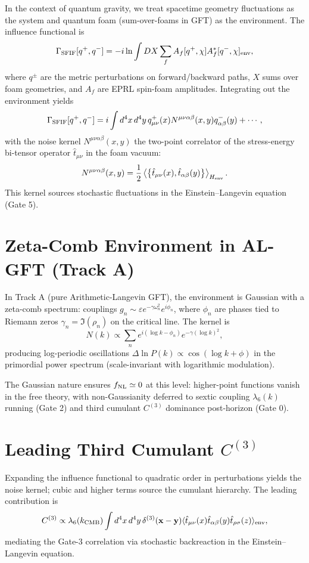 \documentclass[11pt,a4paper,twoside]{article}
\begin{document}
In the context of quantum gravity, we treat spacetime geometry fluctuations as the system and quantum foam (sum-over-foams in GFT) as the environment. The influence functional is
\[
\Gamma_{\rm SFIF}[q^+, q^-] = -i \ln \int DX \sum_{f} A_f[q^+, \chi] A_f^*[q^-, \chi]_{\rm env},
\]
where $q^\pm$ are the metric perturbations on forward/backward paths, $X$ sums over foam geometries, and $A_f$ are EPRL spin-foam amplitudes. Integrating out the environment yields
\[
\Gamma_{\rm SFIF}[q^+, q^-] = i \int d^4x \, d^4y \, q^+_{\mu\nu}(x) N^{\mu\nu\alpha\beta}(x,y) q^-_{\alpha\beta}(y) + \cdots,
\]
with the noise kernel $N^{\mu\nu\alpha\beta}(x,y)$ the two-point correlator of the stress-energy bi-tensor operator $\hat{t}_{\mu\nu}$ in the foam vacuum:
\[
N^{\mu\nu\alpha\beta}(x,y) = \frac{1}{2} \left\langle \left\{ \hat{t}_{\mu\nu}(x), \hat{t}_{\alpha\beta}(y) \right\} \right\rangle_{H_{\rm env}}.
\]
This kernel sources stochastic fluctuations in the Einstein–Langevin equation (Gate 5).

\section{Zeta-Comb Environment in AL-GFT (Track A)}
In Track A (pure Arithmetic-Langevin GFT), the environment is Gaussian with a zeta-comb spectrum: couplings $g_n \sim \varepsilon e^{-\gamma \omega_n^2} e^{i \phi_n}$, where $\phi_n$ are phases tied to Riemann zeros $\gamma_n = \Im(\rho_n)$ on the critical line. The kernel is
\[
N(k) \propto \sum_n e^{i (\log k - \phi_n)} e^{-\gamma (\log k)^2},
\]
producing log-periodic oscillations $\Delta \ln P(k) \propto \cos(\log k + \phi)$ in the primordial power spectrum (scale-invariant with logarithmic modulation).

The Gaussian nature ensures $f_{\rm NL} \simeq 0$ at this level: higher-point functions vanish in the free theory, with non-Gaussianity deferred to sextic coupling $\lambda_6(k)$ running (Gate 2) and third cumulant $C^{(3)}$ dominance post-horizon (Gate 0).

\section{Leading Third Cumulant $C^{(3)}$}
Expanding the influence functional to quadratic order in perturbations yields the noise kernel; cubic and higher terms source the cumulant hierarchy. The leading contribution is
\[
C^{(3)} \propto \lambda_6(k_{\rm CMB}) \int d^4x \, d^4y \, \delta^{(3)}(\mathbf{x}-\mathbf{y}) \langle \hat{t}_{\mu\nu}(x) \hat{t}_{\alpha\beta}(y) \hat{t}_{\rho\sigma}(z) \rangle_{\rm env},
\]
mediating the Gate-3 correlation via stochastic backreaction in the Einstein–Langevin equation.
\end{document}
